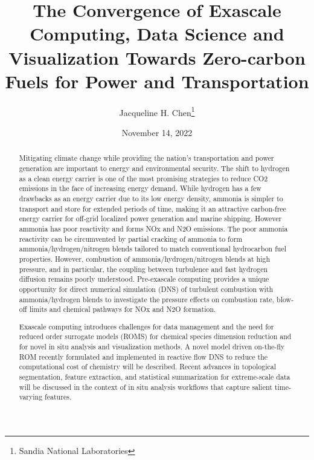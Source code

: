\documentclass{article}
\title{The Convergence of Exascale Computing, Data Science and Visualization Towards Zero-carbon Fuels for Power 
and Transportation}
\author{Jacqueline H. Chen\thanks{Sandia National Laboratories}}
\date{November 14, 2022}
\providecommand{\keywords}[1]{\textbf{\textit{Keywords---}} #1}
\begin{document}
\maketitle

\begin{abstract}
    Mitigating climate change while providing the nation’s transportation and power generation are important to energy and environmental security.  The shift to hydrogen as a clean energy carrier is one of the most promising strategies to reduce CO2 emissions in the face of increasing energy demand.  While hydrogen has a few drawbacks as an energy carrier due to its low energy density, ammonia is simpler to transport and store for extended periods of time, making it an attractive carbon-free energy carrier for off-grid localized power generation and marine shipping.  However ammonia has poor reactivity and forms NOx and N2O emissions.  The poor ammonia reactivity can be circumvented by partial cracking of ammonia to form ammonia/hydrogen/nitrogen blends tailored to match conventional hydrocarbon fuel properties. However, combustion of ammonia/hydrogen/nitrogen blends at high pressure, and in particular, the coupling between turbulence and fast hydrogen diffusion remains poorly understood. Pre-exascale computing provides a unique opportunity for direct numerical simulation (DNS) of turbulent combustion with ammonia/hydrogen blends to investigate the pressure effects on combustion rate, blow-off limits and chemical pathways for NOx and N2O formation.

    Exascale computing introduces challenges for data management and the need for reduced order surrogate models (ROMS) for chemical species dimension reduction and for novel in situ analysis and visualization methods.  A novel model driven on-the-fly ROM recently formulated and implemented in reactive flow DNS to reduce the computational cost of chemistry will be described.    Recent advances in topological segmentation, feature extraction, and statistical summarization for extreme-scale data will be discussed in the context of in situ analysis workflows that capture salient time-varying features.
    
\end{abstract}

\end{document}
